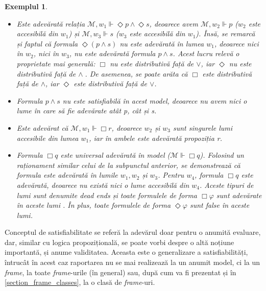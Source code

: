 \documentclass[12pt, openany]{book}
\newtheorem{example}[definition]{Exemplul} %
\newcommand{\mysectionreference}[1]{\autoref{#1}}
\begin{document}
\begin{example}
                \begin{itemize}
                    \item Este adevărată relația $\mathcal{M},w_1 \Vdash \Diamond p \wedge \Diamond s$, deoarece avem 
                    $\mathcal{M},w_2 \Vdash p$ ($w_2$ este accesibilă din $w_1$) și $\mathcal{M},w_3 \Vdash s$ ($w_3$ este 
                    accesibilă din $w_1$). Însă, se remarcă și faptul că formula $\Diamond (p \wedge s)$ nu este adevărată 
                    în lumea $w_1$, deoarece nici în $w_2$, nici în $w_3$, nu este adevărată formula $p \wedge s$. Acest lucru
                    relevă o proprietate mai generală: $\Box$ nu este distributivă față de $\vee$, iar $\Diamond$ nu este 
                    distributivă față de $\wedge\;$\cite{lecture_notes_hedin}. De asemenea, se poate arăta că $\Box$ este 
                    distributivă față de $\wedge$, iar $\Diamond$ este distributivă față de $\vee$.
                    \item Formula $p \wedge s$ nu este satisfiabilă în acest model, deoarece nu avem nici o lume în care să 
                    fie adevărate atât p, cât și s.
                    \item Este adevărat că $\mathcal{M},w_1 \Vdash \Box r$, deoarece $w_2$ și $w_3$ sunt singurele lumi 
                    accesibile din lumea $w_1$, iar în ambele este adevărată propoziția r.
                    \item Formula $\Box q$ este universal adevărată în model ($\mathcal{M} \Vdash \Box q$). Folosind un 
                    raționament similar celui de la subpunctul anterior, se demonstrează că formula este adevărată în lumile
                    $w_1, w_2$ și $w_3$. Pentru $w_4$, formula $\Box q$ este adevărată, deoarece nu există nici o lume accesibilă din $w_4$.
                    Aceste tipuri de lumi sunt denumite \textit{dead ends} și toate formulele de forma $\Box \varphi$ sunt 
                    adevărate în aceste lumi \cite{modal_logic}. În plus, toate formulele de forma $\Diamond \varphi$ sunt 
                    false în aceste lumi.
                \end{itemize}
            \end{example}

            \par{}
                Conceptul de satisfiabilitate se referă la adevărul doar pentru o anumită evaluare, dar, similar cu logica 
                propozițională, se poate vorbi despre o altă noțiune importantă, și anume validitatea. Aceasta este o generalizare
                a satisfiabilități, întrucât în acest caz raportarea nu se mai realizează la un anumit model, ci la un \textit{frame},
                la toate \textit{frame}-urile (în general) sau, după cum va fi prezentat și în 
                \mysectionreference{section_frame_classes}, la o clasă de \textit{frame}-uri.
\end{document}
